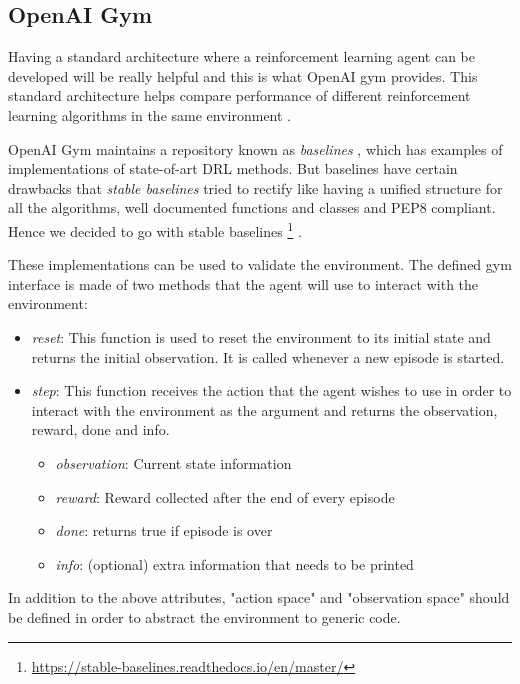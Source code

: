 \documentclass[12pt]{report}
\begin{document}
\subsection{OpenAI Gym} \label{OpenAIGym}

Having a standard architecture where a reinforcement learning agent can be developed will be really helpful and this is what OpenAI gym provides. This standard architecture helps compare performance of different reinforcement learning algorithms in the same environment \cite{brockman2016openai}. 

OpenAI Gym maintains a repository known as \emph{baselines} \cite{baselines}, which has examples of implementations of state-of-art DRL methods. But baselines have certain drawbacks that \emph{stable baselines} tried to rectify like having a unified structure for all the algorithms, well documented functions and classes and PEP8 compliant. Hence we decided to go with stable baselines \footnote{\url{https://stable-baselines.readthedocs.io/en/master/}}  \cite{stable-baselines}. 

These implementations can be used to validate the environment. The defined gym interface is made of two methods that the agent will use to interact with the environment:

\begin{itemize}
    \item \emph{reset}: This function is used to reset the environment to its initial state and returns the initial observation. It is called whenever a new episode is started. 
    \item \emph{step}: This function receives the action that the agent wishes to use in order to interact with the environment as the argument and returns the observation, reward, done and info. 
    \begin{itemize}
        \item \emph{observation}: Current state information
        \item \emph{reward}: Reward collected after the end of every episode
        \item \emph{done}: returns true if episode is over
        \item\emph{info}: (optional) extra information that needs to be printed
    \end{itemize}
\end{itemize}

In addition to the above attributes, "action space" and "observation space" should be defined in order to abstract the environment to generic code. 
\end{document}
